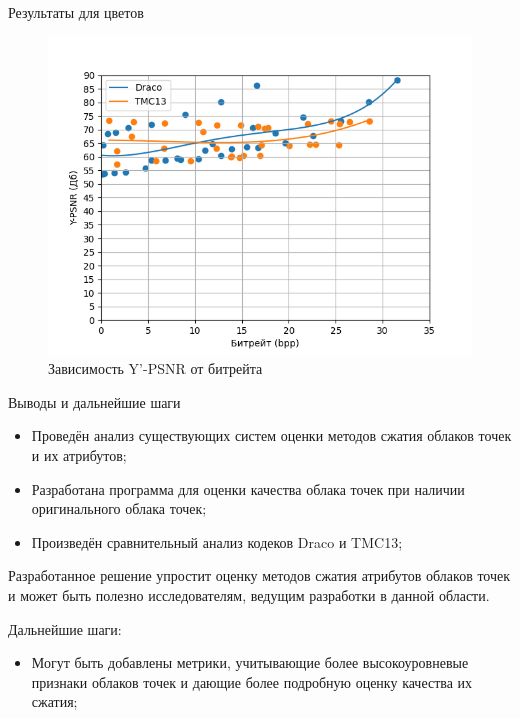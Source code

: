 \documentclass[aspectratio=169]{beamer}
\begin{document}
  \begin{frame}{Результаты для цветов}
    \begin{figure}[H]
        \centering
        \includegraphics[width=0.49\linewidth]{assets/approx_y_psnr.png}
        \caption{ Зависимость Y'-PSNR от битрейта }
        \label{img:pcc_arena_y_psnr}
    \end{figure}
  \end{frame}

  \begin{frame}{Выводы и дальнейшие шаги}
    \begin{itemize}
      \item Проведён анализ существующих систем оценки методов сжатия облаков
      точек и их атрибутов;
      \item Разработана программа для оценки качества облака точек при наличии
      оригинального облака точек;
      \item Произведён сравнительный анализ кодеков Draco и TMC13;
    \end{itemize}

    Разработанное решение упростит оценку методов сжатия атрибутов облаков точек
    и может быть полезно исследователям, ведущим разработки в данной области.

    Дальнейшие шаги:

    \begin{itemize}
      \item Могут быть добавлены метрики, учитывающие более высокоуровневые
      признаки облаков точек и дающие более подробную оценку качества их сжатия;
    \end{itemize}
  \end{frame}
\end{document}
